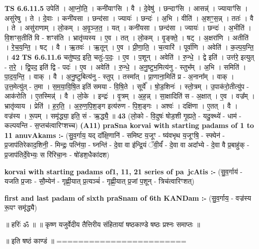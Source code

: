 \documentclass[17pt]{extarticle}
\begin{document}
                  \newline
                                \textbf{ TS 6.6.11.5} \newline
                  उपेति॑ । आ॒प्नो॒ति॒ । कनी॑याꣳसि । वै । दे॒वेषु॑ । छन्दाꣳ॑सि । आसन्न्॑ । ज्यायाꣳ॑सि ।   असु॑रेषु । ते । दे॒वाः । कनी॑यसा । छन्द॑सा । ज्यायः॑ । छन्दः॑ । अ॒भि । वीति॑ । अ॒शꣳ॒॒स॒न्न् । ततः॑ । वै । ते । असु॑राणाम् । लो॒कम् । अ॒वृ॒ञ्ज॒त॒ । यत् । कनी॑यसा । छन्द॑सा । ज्यायः॑ । छन्दः॑ । अ॒भीति॑ । वि॒शꣳस॒तीति॑ वि - शꣳस॑ति । भ्रातृ॑व्यस्य । ए॒व । तत् । लो॒कम् । वृ॒ङ्क्ते॒ । षट् । अ॒क्षरा॑णि । अतीति॑ । रे॒च॒य॒न्ति॒ । षट् । वै । ऋ॒तवः॑ । ऋ॒तून् । ए॒व । प्री॒णा॒ति॒ । च॒त्वारि॑ । पूर्वा॑णि । अवेति॑ । क॒ल्प॒य॒न्ति॒ । \textbf{  42} \newline
                  \newline
                                \textbf{ TS 6.6.11.6} \newline
                  चतु॑ष्पद॒ इति॒ चतुः॑-प॒दः॒ । ए॒व । प॒शून् । अवेति॑ । रु॒न्धे॒ । द्वे इति॑ । उत्त॑रे॒ इत्युत् - त॒रे॒ । द्वि॒पद॒ इति॑ द्वि - पदः॑ । ए॒व । अवेति॑ । रु॒न्धे॒ । अ॒नु॒ष्टुभ॒मित्य॑नु - स्तुभ᳚म् । अ॒भि । समिति॑ । पा॒द॒य॒न्ति॒ । वाक् । वै । अ॒नु॒ष्टुबित्य॑नु - स्तुप् । तस्मा᳚त् । प्रा॒णाना॒मिति॑ प्र - अ॒नाना᳚म् । वाक् । उ॒त्त॒मेत्यु॑त् - त॒मा । स॒म॒या॒वि॒षि॒त इति॑ समया - वि॒षि॒ते । सूर्ये᳚ । षो॒ड॒शिनः॑ । स्तो॒त्रम् । उ॒पाक॑रो॒तीत्यु॑प - आक॑रोति । ए॒तस्मिन्न्॑ । वै । लो॒के । इन्द्रः॑ । वृ॒त्रम् । अ॒ह॒न्न् । सा॒क्षादिति॑ स - अ॒क्षात् । ए॒व । वज्र᳚म् । भ्रातृ॑व्याय । प्रेति॑ । ह॒र॒ति॒ । अ॒रु॒ण॒पि॒श॒ङ्ग इत्य॑रुण - पि॒श॒ङ्गः । अश्वः॑ । दक्षि॑णा । ए॒तत् । वै । वज्र॑स्य । रू॒पम् । समृ॑द्ध्या॒ इति॒ सं - ऋ॒द्ध्यै॒ ॥ \textbf{  43} \newline
                  \newline
                      (लो॒को - वि॒दुषः॑ षोड॒शी गृ॒ह्यते॒ - यदु॒क्थ्ये॑ - धाम॑ - कल्पयन्ति - स॒प्तच॑त्वारिꣳशच्च)  \textbf{(A11)} \newline \newline
\textbf{praSna korvai with starting padams of 1 to 11 anuvAkams :-} \newline
(सु॒व॒र्गाय॒ यद् दा᳚क्षि॒णानि॑ - समिष्ट य॒जूꣳ - ष्य॑वभृथ य॒जूꣳषि॒ - स्फ्येन॑ - प्र॒जाप॑तिरेकाद॒शिनी॒ - मिन्द्रः॒ पत्नि॑या॒ - घ्नन्ति॑ - दे॒वा वा इ॑न्द्रि॒यं ॅवी॒र्यं॑ - दे॒वा वा अदा᳚भ्ये - दे॒वा वै प्र॒बाहु॑क् - प्र॒जाप॑तिर्दे॒वेभ्यः॒ स रि॑रिचा॒नः - षो॑डश॒धैका॑दश) \newline

\textbf{korvai with starting padams of1, 11, 21 series of pa~jcAtis :-} \newline
(सु॒व॒र्गाय॑ - यजति प्र॒जाः - सौ॒म्येन॑ - गृह्णी॒यात् प्र॒त्यञ्चं॑ - गृह्णी॒यात् प्र॒जां प॒शून् - त्रिच॑त्वारिꣳशत्) \newline

\textbf{first and last padam of sixth praSnam of 6th KANDam :-} \newline
(सु॒व॒र्गाय॒ - वज्र॑स्य रू॒पꣳ समृ॑द्ध्यै) \newline 


॥ हरिः॑ ॐ ॥
॥ कृष्ण यजुर्वेदीय तैत्तिरीय संहितायां षष्ठकाण्डे षष्ठः प्रश्नः समाप्तः ॥

॥ इति षष्ठं काण्डं ॥
======================== \newline
\pagebreak
\pagebreak
        
\end{document}
